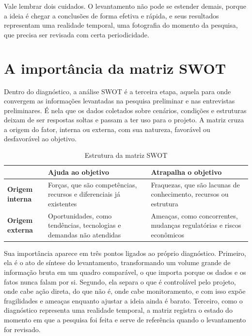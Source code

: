 \documentclass[11pt]{ifscarticle}
\begin{document}
Vale lembrar dois cuidados. O levantamento não pode se estender demais,
porque a ideia é chegar a conclusões de forma efetiva e rápida, e seus
resultados representam uma realidade temporal, uma fotografia do momento da
pesquisa, que precisa ser revisada com certa periodicidade.

\section{A importância da matriz SWOT}

Dentro do diagnóstico, a análise SWOT é a terceira etapa, aquela para onde
convergem as informações levantadas na pesquisa preliminar e nas
entrevistas preliminares. É nela que os dados coletados sobre cenários,
condições e estruturas deixam de ser respostas soltas e passam a ter uso
para o projeto. A matriz cruza a origem do fator, interna ou externa, com
sua natureza, favorável ou desfavorável ao objetivo.

\begin{table}[htb]
\centering
\caption{Estrutura da matriz SWOT}
\label{tab:swot}
\begin{tabular}{|l|p{4.6cm}|p{4.6cm}|}
\hline
 & \textbf{Ajuda ao objetivo} & \textbf{Atrapalha o objetivo} \\ \hline
\textbf{Origem interna} & Forças, que são competências, recursos e
diferenciais já existentes &
Fraquezas, que são lacunas de conhecimento, recursos ou estrutura \\ \hline
\textbf{Origem externa} & Oportunidades, como tendências, tecnologias e
demandas não atendidas &
Ameaças, como concorrentes, mudanças regulatórias e riscos econômicos \\ \hline
\end{tabular}
\end{table}

Sua importância aparece em três pontos ligados ao próprio diagnóstico.
Primeiro, ela é o ato de síntese do levantamento, transformando um volume
grande de informação bruta em um quadro comparável, o que importa porque os
dados e os fatos nunca falam por si. Segundo, ela separa o que é controlável
pelo projeto, onde cabe ação direta, do que não é, onde cabe monitoramento,
e com isso expõe fragilidades e ameaças enquanto ajustar a ideia ainda é
barato. Terceiro, como o diagnóstico representa uma realidade temporal, a
matriz registra o estado do momento em que a pesquisa foi feita e serve de
referência quando o levantamento for revisado.
\end{document}
